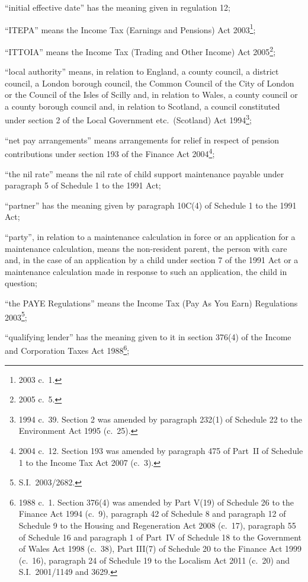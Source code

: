\documentclass[12pt,a4paper]{article}
\begin{document}
\begin{enumerate}
“initial effective date” has the meaning given in regulation 12;

“ITEPA” means the Income Tax (Earnings and Pensions) Act 2003\footnote{2003 c.~1.};

“ITTOIA” means the Income Tax (Trading and Other Income) Act 2005\footnote{2005 c.~5.};

“local authority” means, in relation to England, a county council, a district council, a London borough council, the Common Council of the City of London or the Council of the Isles of Scilly and, in relation to Wales, a county council or a county borough council and, in relation to Scotland, a council constituted under section 2 of the Local Government etc.\ (Scotland) Act 1994\footnote{1994 c.~39. Section 2 was amended by paragraph 232(1) of Schedule 22 to the Environment Act 1995 (c.~25).};

“net pay arrangements” means arrangements for relief in respect of pension contributions under section 193 of the Finance Act 2004\footnote{2004 c.~12. Section 193 was amended by paragraph 475 of Part~II of Schedule 1 to the Income Tax Act 2007 (c.~3).};

“the nil rate” means the nil rate of child support maintenance payable under paragraph 5 of Schedule 1 to the 1991 Act;

“partner” has the meaning given by paragraph 10C(4) of Schedule 1 to the 1991 Act;

“party”, in relation to a maintenance calculation in force or an application for a maintenance calculation, means the non-resident parent, the person with care and, in the case of an application by a child under section 7 of the 1991 Act or a maintenance calculation made in response to such an application, the child in question;

“the PAYE Regulations” means the Income Tax (Pay As You Earn) Regulations 2003\footnote{S.I.~2003/2682.};

“qualifying lender” has the meaning given to it in section 376(4) of the Income and Corporation Taxes Act 1988\footnote{1988 c.~1. Section 376(4) was amended by Part V(19) of Schedule 26 to the Finance Act 1994 (c.~9), paragraph 42 of Schedule 8 and paragraph 12 of Schedule 9 to the Housing and Regeneration Act 2008 (c.~17), paragraph 55 of Schedule 16 and paragraph 1 of Part~IV of Schedule 18 to the Government of Wales Act 1998 (c.~38), Part III(7) of Schedule 20 to the Finance Act 1999 (c.~16), paragraph 24 of Schedule 19 to the Localism Act 2011 (c.~20) and S.I.~2001/1149 and 3629.};


\end{enumerate}
\end{document}
